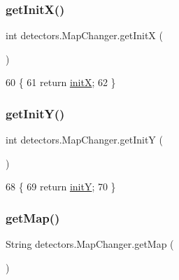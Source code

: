 \subsubsection{\texorpdfstring{get\+Init\+X()}{getInitX()}}
{\footnotesize\ttfamily int detectors.\+Map\+Changer.\+get\+InitX (\begin{DoxyParamCaption}{ }\end{DoxyParamCaption})\hspace{0.3cm}{\ttfamily [inline]}}


\begin{DoxyCode}
60                           \{
61         \textcolor{keywordflow}{return} \mbox{\hyperlink{classdetectors_1_1_map_changer_a45c8356dc930a1289333a55a1a13a606}{initX}};
62     \}
\end{DoxyCode}
\mbox{\label{classdetectors_1_1_map_changer_acb4c06fa4e179d3b8465e80932ed2310}} 
\subsubsection{\texorpdfstring{get\+Init\+Y()}{getInitY()}}
{\footnotesize\ttfamily int detectors.\+Map\+Changer.\+get\+InitY (\begin{DoxyParamCaption}{ }\end{DoxyParamCaption})\hspace{0.3cm}{\ttfamily [inline]}}


\begin{DoxyCode}
68                           \{
69         \textcolor{keywordflow}{return} \mbox{\hyperlink{classdetectors_1_1_map_changer_a893e5aefb0e75665409f73b6e1542b59}{initY}};
70     \}
\end{DoxyCode}
\mbox{\label{classdetectors_1_1_map_changer_a9751921504c31dd83363b128431b6633}} 
\subsubsection{\texorpdfstring{get\+Map()}{getMap()}}
{\footnotesize\ttfamily String detectors.\+Map\+Changer.\+get\+Map (\begin{DoxyParamCaption}{ }\end{DoxyParamCaption})\hspace{0.3cm}{\ttfamily [inline]}}


